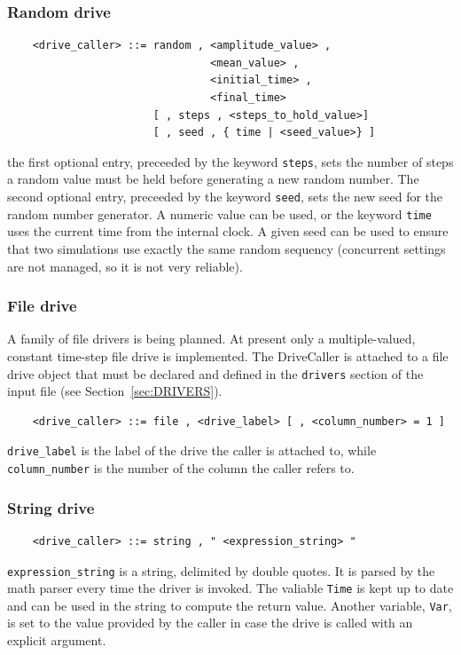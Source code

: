 \documentclass[10pt,dvips]{report}
\begin{document}
\subsubsection{Random drive}
\begin{verbatim}
    <drive_caller> ::= random , <amplitude_value> ,
                                <mean_value> ,
                                <initial_time> ,
                                <final_time> 
                       [ , steps , <steps_to_hold_value>]
                       [ , seed , { time | <seed_value>} ]
\end{verbatim}
the first optional entry, preceeded by the keyword {\tt steps}, sets the
number of steps a random value must be held before generating a new
random number. The second optional entry, preceeded by the keyword
{\tt seed}, sets the new seed for the random number generator. A numeric
value can be used, or the keyword {\tt time} uses the current time from
the internal clock. A given seed can be used to ensure that two
simulations use exactly the same random sequency (concurrent settings 
are not managed, so it is not very reliable).

\subsubsection{File drive}
A family of file drivers is being planned.
At present only a multiple-valued, constant time-step file drive is
implemented.
The DriveCaller is attached to a file drive object that must be declared
and defined in the {\tt drivers} section of the input file 
(see Section~\ref{sec:DRIVERS}).
\begin{verbatim}
    <drive_caller> ::= file , <drive_label> [ , <column_number> = 1 ]
\end{verbatim}
{\tt drive\_label} is the label of the drive the caller is attached to, while
{\tt column\_number} is the number of the column the caller refers to.

\subsubsection{String drive}
\begin{verbatim}
    <drive_caller> ::= string , " <expression_string> "
\end{verbatim}
{\tt expression\_string} is a string, delimited by double quotes.
It is parsed by the math parser every time the driver is invoked.
The valiable {\tt Time} is kept up to date and can be used in the 
string to compute the return value.
Another variable, {\tt Var}, is set to the value provided by the caller
in case the drive is called with an explicit argument.
\end{document}
